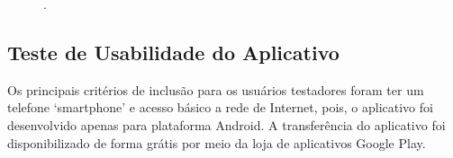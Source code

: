 \begin{figure}[H]
.
\label{figura_44}
\end{figure}


\subsection{Teste de Usabilidade do Aplicativo}

Os principais critérios de inclusão para os usuários testadores foram ter um telefone ‘smartphone’ e acesso básico a rede de Internet, pois, o aplicativo foi desenvolvido apenas para plataforma Android. A transferência do aplicativo foi disponibilizado de forma grátis por meio da loja de aplicativos Google Play.

